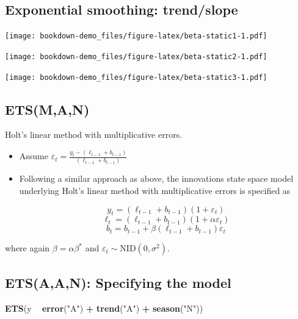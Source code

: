 \documentclass[]{book}
\newenvironment{Shaded}{\begin{snugshade}}{\end{snugshade}}
\newcommand{\KeywordTok}[1]{\textcolor[rgb]{0.13,0.29,0.53}{\textbf{#1}}}
\newcommand{\NormalTok}[1]{#1}
\newcommand{\OperatorTok}[1]{\textcolor[rgb]{0.81,0.36,0.00}{\textbf{#1}}}
\newcommand{\StringTok}[1]{\textcolor[rgb]{0.31,0.60,0.02}{#1}}
\begin{document}
\hypertarget{exponential-smoothing-trendslope}{%
\subsection{Exponential smoothing: trend/slope}\label{exponential-smoothing-trendslope}}

\texttt{[image: bookdown-demo\_files/figure-latex/beta-static1-1.pdf]}

\texttt{[image: bookdown-demo\_files/figure-latex/beta-static2-1.pdf]}

\texttt{[image: bookdown-demo\_files/figure-latex/beta-static3-1.pdf]}

\hypertarget{etsman}{%
\subsection{ETS(M,A,N)}\label{etsman}}

Holt's linear method with multiplicative errors.

\begin{itemize}
\item
  Assume \(\varepsilon_t=\frac{y_t-(\ell_{t-1}+b_{t-1})}{(\ell_{t-1}+b_{t-1})}\)
\item
  Following a similar approach as above, the innovations state space model underlying Holt's linear method with multiplicative errors is specified as

  \[y_t=(\ell_{t-1}+b_{t-1})(1+\varepsilon_t)\]
  \[\ell_t=(\ell_{t-1}+b_{t-1})(1+\alpha \varepsilon_t)\]
  \[b_t=b_{t-1}+\beta(\ell_{t-1}+b_{t-1}) \varepsilon_t\]
\end{itemize}

where again \(\beta=\alpha \beta^*\) and \(\varepsilon_t \sim \text{NID}(0,\sigma^2)\).

\hypertarget{etsaan-specifying-the-model}{%
\subsection{ETS(A,A,N): Specifying the model}\label{etsaan-specifying-the-model}}

\begin{Shaded}
\begin{Highlighting}[]
\KeywordTok{ETS}\NormalTok{(y }\OperatorTok{~}\StringTok{ }\KeywordTok{error}\NormalTok{(}\StringTok{"A"}\NormalTok{) }\OperatorTok{+}\StringTok{ }\KeywordTok{trend}\NormalTok{(}\StringTok{"A"}\NormalTok{) }\OperatorTok{+}\StringTok{ }\KeywordTok{season}\NormalTok{(}\StringTok{"N"}\NormalTok{))}
\end{Highlighting}
\end{Shaded}
\end{document}
